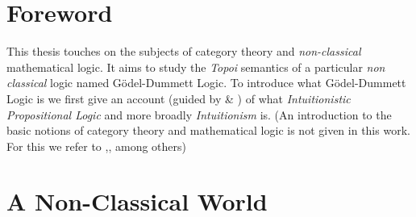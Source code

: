 
	\section{Foreword}
		
	This thesis touches on the subjects of category theory and \emph{non-classical} mathematical logic.
 	It aims to study the \emph{Topoi} semantics of a particular \emph{non classical} logic named Gödel-Dummett Logic. \newline
	To introduce what Gödel-Dummett Logic is we first give an account (guided by \cite{goldblatt} \& \cite{awodey}) of what \emph{Intuitionistic Propositional Logic} and more broadly \emph{Intuitionism} is. 
	\newline
	\newline
	(An introduction to the basic notions of category theory and mathematical logic is not given in this work.
	For this we refer to \cite{awodey},\cite{maclane},\cite{goldblatt} among others)
	

	\newpage
	
	\section{A Non-Classical World}
	
